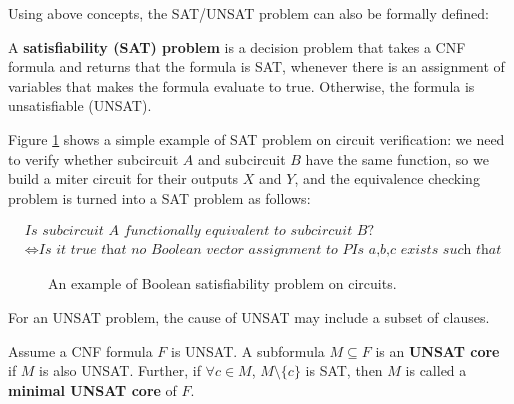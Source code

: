 Using above concepts, the SAT/UNSAT problem can also be formally defined:
\begin{Definition}
A {\bf satisfiability (SAT) problem} is a decision problem that takes a CNF formula and returns
that the formula is SAT, whenever there is an assignment of variables that makes the 
formula evaluate to true. Otherwise, the formula is unsatisfiable (UNSAT).
\end{Definition}

Figure \ref{fig:SAT} shows a simple example of SAT problem on circuit verification:
we need to verify whether subcircuit $A$ and subcircuit $B$ have the same function, so
we build a miter circuit for their outputs $X$ and $Y$, and the equivalence checking 
problem is turned into a SAT problem as follows:

\vspace{-0.7in}
\begin{center}
\begin{align*}
&\textit{Is\ subcircuit\ A\ functionally\ equivalent\ to\ subcircuit\ B?}\\
&\Longleftrightarrow
\textit{Is\ it\ true\ that\ no\ Boolean\ vector\ assignment\ to\ PIs\ a,b,c\ exists\ such\ that\ Z=1?}
\end{align*}
\end{center}

\begin{figure}[bp]
\caption{An example of Boolean satisfiability problem on circuits.}
\label{fig:SAT}
\end{figure}

For an UNSAT problem, the cause of UNSAT may include a subset of clauses.
\begin{Definition}
Assume a CNF formula $F$ is UNSAT. A subformula $M \subseteq F$ is an {\bf UNSAT core} 
if $M$ is also UNSAT. Further, if $\forall c\in M$, $M\setminus\{c\}$ is SAT, then 
$M$ is called a {\bf minimal UNSAT core} of $F$.
\end{Definition}

